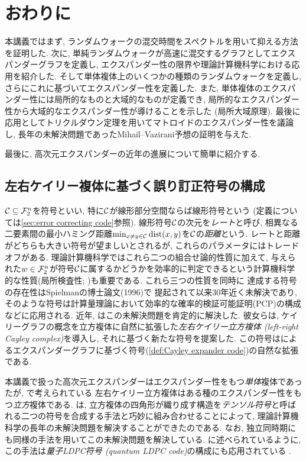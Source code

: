 \chapter{おわりに}
本講義ではまず, ランダムウォークの混交時間をスペクトルを用いて抑える方法を証明した.
次に, 単純ランダムウォークが高速に混交するグラフとしてエクスパンダーグラフを定義し,
エクスパンダー性の限界や理論計算機科学における応用を紹介した.
そして単体複体上のいくつかの種類のランダムウォークを定義し,
さらにこれに基づいてエクスパンダー性を定義した.
また, 単体複体のエクスパンダー性には局所的なものと大域的なものが定義でき,
局所的なエクスパンダー性から大域的なエクスパンダー性が導けることを示した (局所大域原理).
最後に応用としてトリクルダウン定理を用いてマトロイドのエクスパンダー性を議論し,
長年の未解決問題であったMihail--Vazirani予想の証明を与えた.

最後に, 高次元エクスパンダーの近年の進展について簡単に紹介する.
%
\section{左右ケイリー複体に基づく誤り訂正符号の構成}
$\mathcal{C}\subseteq \mathcal{F}_2^n$を符号といい, 特に$\mathcal{C}$が線形部分空間ならば線形符号という (定義については\cref{sec:error correcting code}参照).
線形符号$\mathcal{C}$の次元を\emph{レート}と呼び,
相異なる二要素間の最小ハミング距離$\min_{x\neq y\in \mathcal{C}}\mathrm{dist}(x,y)$を$\mathcal{C}$の\emph{距離}という.
レートと距離がどちらも大きい符号が望ましいとされるが, これらのパラメータにはトレードオフがある.
理論計算機科学ではこれら二つの組合せ論的性質に加えて, 与えられた$w\in\mathcal{F}_2^n$が符号$\mathcal{C}$に属するかどうかを効率的に判定できるという計算機科学的な性質(局所検査性; \citet{GS06})も重要である.
これら三つの性質を同時に
達成する符号の存在性はSpielmanの博士論文(1996)で
提起されて以来30年近く未解決であり, そのような符号は計算量理論において効率的な確率的検証可能証明(PCP)の構成などに応用される.
近年, \citet{DELLM22}はこの未解決問題を肯定的に解決した.
彼女らは, ケイリーグラフの概念を立方複体に自然に拡張した\emph{左右ケイリー立方複体 (left-right Cayley complex)}を導入し, それに基づく新たな符号を提案した.
この符号は\cite{SS96}によるエクスパンダーグラフに基づく符号(\cref{def:Cayley expander code})の自然な拡張である.

本講義で扱った高次元エクスパンダーはエクスパンダー性をもつ\emph{単体}複体であったが, \cite{DELLM22}で考えられている
左右ケイリー立方複体はある種のエクスパンダー性をもつ\emph{立方}複体である.
\citet{DELLM22}は, 立方複体の四角形が織り成す構造を\emph{テンソル符号}と呼ばれる二つの符号を合成する手法と巧妙に組み合わせることによって, 理論計算機科学の長年の未解決問題を解決することができたのである.
なお, 独立同時期に\citet{LH22,PK22}も同様の手法を用いてこの未解決問題を解決している.
\cite{LH22,PK22}に述べられているように, この手法は\emph{量子LDPC符号 (quantum LDPC code)}の構成にも応用されている \cite{LZ22}.